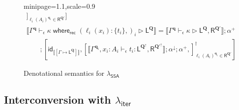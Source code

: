 \documentclass[acmsmall,screen,anonymous,review]{acmart}
\newcommand{\mc}[1]{\ensuremath{\mathcal{#1}}}
\newcommand{\mb}[1]{\ensuremath{\mathbf{#1}}}
\newcommand{\ms}[1]{\ensuremath{\mathsf{#1}}}
\newcommand{\lto}{:}
\newcommand{\cwhere}[2]{#1\;\ms{where}_{\ms{rec}}\;#2}
\newcommand{\wbranch}[3]{#1(#2) \lto \{#3\}}
\newcommand{\hasty}[4]{#1 \vdash_{#2} #3: {#4}}
\newcommand{\haslb}[4]{#1 \vdash_{#2} #3 \rhd #4}
\newcommand{\tref}{\twoheadrightarrow}
\newcommand{\lbref}[5]{#1 \vdash_{#2} #3 \tref #4 \rhd {#5}}
\newcommand{\ltoty}[2]{[#1 \mapsto #2]}
\newcommand{\dnt}[1]{\llbracket{#1}\rrbracket}
\newcommand{\subiterexp}{\texorpdfstring{\(\lambda_{\ms{iter}}\)}{lambda-iter}}
\newcommand{\isotopessa}{\(\lambda_{\ms{SSA}}\)}
\newcommand{\zeroqv}[1]{#1^\uparrow}
\begin{document}
\begin{figure}
\begin{adjustbox}{minipage=1.1\textwidth,scale=0.9}
\begin{gather*}
      ]_{\ell_i(A_i)^{\mb{q}_i} \in \ms{R}^{\mb{Q}'}}
    ]
    \\
    \dnt
    {\haslb{\Gamma^{\mb{q}}}{\epsilon}{\cwhere{\kappa}{(\wbranch{\ell_i}{x_i}{t_i},)_i}}
      {\ms{L}^{\mb{Q}}}}
    = \dnt{\haslb{\Gamma^{\mb{q}}}{\epsilon}{\kappa}
      {\ms{L}^{\mb{Q}}, \ms{R}^{\mb{Q}'}}} ; \alpha^+
    \\
    \qquad ; [
      \ms{id}_{\dnt{\ltoty{\Gamma}{\ms{L}^{\mb{Q}}}}},
      [
        \dnt{\hasty{\Gamma^{\mb{q}_i}, x_i : A_i}{\epsilon}{t_i}
          {\ms{L}^{\zeroqv{\mb{Q}}}, \ms{R}^{\zeroqv{\mb{Q}'}}}} ; \alpha^\downarrow ; \alpha^+,
      ]_{\ell_i(A_i)^{\mb{q}_i} \in \ms{R}^{\mb{Q}'}}^\dagger
    ]
  \end{gather*}
  \end{adjustbox}
  \caption{Denotational semantics for \isotopessa{}}
  \Description{}
  \label{fig:ssa-densem}
\end{figure}

\subsection{Interconversion with \subiterexp{}}
\label{ssec:interconversion}

\end{document}
